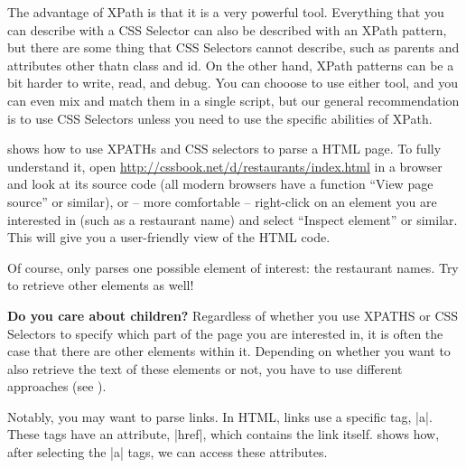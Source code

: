 The advantage of XPath is that it is a very powerful tool. 
Everything that you can describe with a CSS Selector can also be described with an XPath pattern,
but there are some thing that CSS Selectors cannot describe,
such as parents and attributes other thatn class and id.
On the other hand, XPath patterns can be a bit harder to write, read, and debug.
You can chooose to use either tool, and you can even mix and match them in a single script,
but our general recommendation is to use CSS Selectors unless you need to use the specific abilities of XPath. 

 shows how to use XPATHs and CSS selectors to parse
a HTML page. To fully understand it, open
\url{http://cssbook.net/d/restaurants/index.html} in a browser and
look at its source code (all modern browsers have a function ``View
page source'' or similar), or -- more comfortable -- right-click on an
element you are interested in (such as a restaurant name) and select
``Inspect element'' or similar. This will give you a user-friendly
view of the HTML code.



Of course,  only parses one possible element of interest: the restaurant names. Try to retrieve other elements as well!

\begin{feature}\textbf{Do you care about children?}
Regardless of whether you use XPATHS or CSS Selectors to specify which part of the page you are interested in, it is often the case that there are other elements within it. Depending on whether you want to also retrieve the text of these elements or not, you have to use different approaches (see ).
\end{feature}



Notably, you may want to parse links. In HTML, links use a specific tag, |a|. These tags have an attribute, |href|, which contains the link itself.  shows how, after selecting the |a| tags, we can access these attributes. 




